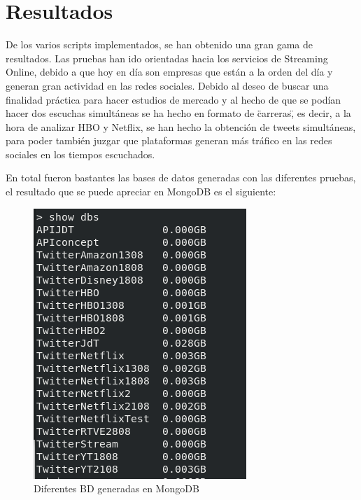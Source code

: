 
\chapter{Resultados}

De los varios scripts implementados, se han obtenido una gran gama de resultados. Las pruebas han ido orientadas hacia los servicios de Streaming Online, debido a que hoy en día son empresas que están a la orden del día y generan gran actividad en las redes sociales. Debido al deseo de buscar una finalidad práctica para hacer estudios de mercado y al hecho de que se podían hacer dos escuchas simultáneas se ha hecho en formato de \"carreras\", es decir, a la hora de analizar HBO y Netflix, se han hecho la obtención de tweets simultáneas, para poder también juzgar que plataformas generan más tráfico en las redes sociales en los tiempos escuchados. 

En total fueron bastantes las bases de datos generadas con las diferentes pruebas, el resultado que se puede apreciar en MongoDB es el siguiente:


\begin{figure}[H]
	\centering
	\includegraphics[scale=.6]{imagenes/BD-Mongo.png}
	\caption{Diferentes BD generadas en MongoDB}
	\label{fig:BD-MongoDB}
\end{figure}


